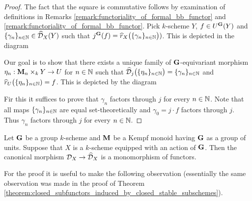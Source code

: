 \begin{proof}
The fact that the square is commutative follows by examination of definitions in Remarks \ref{remark:functoriality_of_formal_bb_functor} and \ref{remark:functoriality_of_formal_bb_functor}. Pick $k$-scheme $Y$, $f\in U^{\mathbf{G}}(Y)$ and $\{\gamma_n\}_{n\in {\mathbb N}} \in \widehat{{\mathcal D}}_X(Y)$ such that $j^{\mathbf{G}}(f) = \widehat{r}_X\big(\{\gamma_n\}_{n\in {\mathbb N}}\big))$. This is depicted in the diagram
\begin{center}
\end{center}
Our goal is to show that there exists a unique family of $\mathbf{G}$-equivariant morphism $\eta_n:\mathbf{M}_n\times_kY\rightarrow U$ for $n\in {\mathbb N}$ such that $\widehat{{\mathcal D}}_j\big(\{\eta_n\}_{n\in {\mathbb N}}\big) = \{\gamma_n\}_{n\in {\mathbb N}}$ and $\widehat{r}_U\big(\{\eta_n\}_{n\in {\mathbb N}}) = f$. This is depicted by the diagram
\begin{center}
\end{center}
Fir this it suffices to prove that $\gamma_n$ factors through $j$ for every $n\in {\mathbb N}$. Note that all maps $\{\gamma_n\}_{n\in {\mathbb N}}$ are equal set-theoretically and $\gamma_0 = j\cdot  f$ factors through $j$. Thus $\gamma_n$ factors through $j$ for every $n\in {\mathbb N}$.
\end{proof}

\begin{theorem}\label{theorem:comparison_between_formal_and_algebraic_bb_functor_is_injective}
Let $\mathbf{G}$ be a group $k$-scheme and $\mathbf{M}$ be a Kempf monoid having $\mathbf{G}$ as a group of units. Suppose that $X$ is a $k$-scheme equipped with an action of $\mathbf{G}$. Then the canonical morphism ${\mathcal D}_X\rightarrow \widehat{{\mathcal D}}_X$ is a monomorphism of functors.
\end{theorem}
\noindent
For the proof it is useful to make the following observation (essentially the same observation was made in the proof of Theorem \ref{theorem:closed_subfunctors_induced_by_closed_stable_subschemes}).

